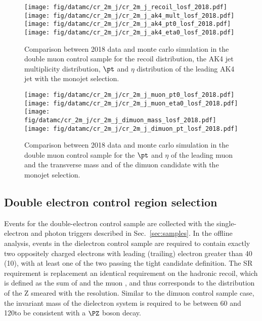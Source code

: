 \begin{figure}[htbp]
    \begin{center}
        \texttt{[image: fig/datamc/cr\_2m\_j/cr\_2m\_j\_recoil\_losf\_2018.pdf]}
        \texttt{[image: fig/datamc/cr\_2m\_j/cr\_2m\_j\_ak4\_mult\_losf\_2018.pdf]} \\
        \texttt{[image: fig/datamc/cr\_2m\_j/cr\_2m\_j\_ak4\_pt0\_losf\_2018.pdf]}
        \texttt{[image: fig/datamc/cr\_2m\_j/cr\_2m\_j\_ak4\_eta0\_losf\_2018.pdf]}
    \end{center}
    \caption{Comparison between 2018 data and monte carlo simulation in the double muon control sample for
        the recoil distribution, the AK4 jet multiplicity distribution,  $\pt$ and $\eta$ distribution
        of the leading AK4  jet with the monojet selection.}
    \label{fig:DM_monojet_2018}
\end{figure}

\begin{figure}[htbp]
    \begin{center}
        \texttt{[image: fig/datamc/cr\_2m\_j/cr\_2m\_j\_muon\_pt0\_losf\_2018.pdf]}
        \texttt{[image: fig/datamc/cr\_2m\_j/cr\_2m\_j\_muon\_eta0\_losf\_2018.pdf]} \\
        \texttt{[image: fig/datamc/cr\_2m\_j/cr\_2m\_j\_dimuon\_mass\_losf\_2018.pdf]}
        \texttt{[image: fig/datamc/cr\_2m\_j/cr\_2m\_j\_dimuon\_pt\_losf\_2018.pdf]}
    \end{center}
    \caption{Comparison between 2018 data and monte carlo simulation in the double muon control sample for
    the $\pt$ and $\eta$ of the leading muon and the transverse mass and \pt of the dimuon candidate with the monojet selection.}
    \label{fig:DM_2_monojet_2018}
\end{figure}

\newpage

\subsection{Double electron control region selection}
\label{sec:selection_cr_2e}
Events for the double-electron control sample are collected with the single-electron and photon triggers described in Sec.~\ref{sec:samples}. In the offline analysis, events in the dielectron control sample are required to contain exactly two oppositely charged electrons with leading (trailing) electron \pt greater than 40 (10)\GeV, with at least one of the two passing the tight candidate definition. The SR \ptmiss requirement is replacement an identical requirement on the hadronic recoil, which is defined as the sum of \ptvecmiss and the muon \vpt, and thus corresponds to the distribution of the Z \pt smeared with the \ptmiss resolution. Similar to the dimuon control sample case, the invariant mass of the dielectron system is required to be between 60 and 120\GeV to be consistent with a $\PZ$ boson decay.


